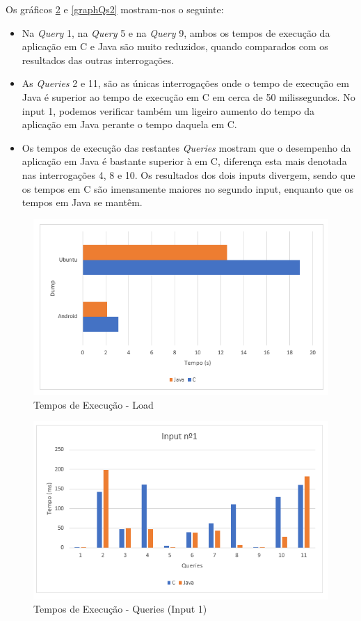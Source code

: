 \documentclass[a4paper, 11pt, oneside]{article}
\begin{document}
Os gráficos \ref{graphQs1} e \ref{graphQs2} mostram-nos o seguinte:
\begin{itemize}
\item Na \textit{Query} 1, na \textit{Query} 5 e na \textit{Query} 9, ambos os tempos de execução da aplicação em C e Java são muito reduzidos, quando comparados com os resultados das outras interrogações.
\item As \textit{Queries} 2 e 11, são as únicas interrogações onde o tempo de execução em Java é superior ao tempo de execução em C em cerca de 50 milissegundos. No input 1, podemos verificar também um ligeiro aumento do tempo da aplicação em Java perante o tempo daquela em C.
\item Os tempos de execução das restantes \textit{Queries} mostram que o desempenho da aplicação em Java é bastante superior à em C, diferença esta mais denotada nas interrogações 4, 8 e 10. Os resultados dos dois inputs divergem, sendo que os tempos em C são imensamente maiores no segundo input, enquanto que os tempos em Java se mantêm.
\end{itemize}

\begin{figure}[h]
\centering
\includegraphics[scale=.5]{loads.png}
\caption{Tempos de Execução - Load \label{graphLoad}}
\end{figure}

\begin{figure}[h] 
\centering
\includegraphics[scale=.5]{input_1.png}
\caption{Tempos de Execução - Queries (Input 1) \label{graphQs1}}
\end{figure}
\end{document}
